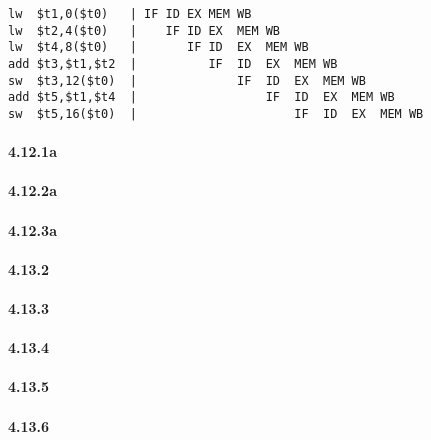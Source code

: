 \documentclass{article}
\begin{document}
\begin{enumerate}
  \begin{verbatim}
lw  $t1,0($t0)   | IF ID EX MEM WB
lw  $t2,4($t0)   |    IF ID EX  MEM WB
lw  $t4,8($t0)   |       IF ID  EX  MEM WB
add $t3,$t1,$t2  |          IF  ID  EX  MEM WB
sw  $t3,12($t0)  |              IF  ID  EX  MEM WB
add $t5,$t1,$t4  |                  IF  ID  EX  MEM WB
sw  $t5,16($t0)  |                      IF  ID  EX  MEM WB
  \end{verbatim}

\end{enumerate}

\clearpage

\paragraph{4.12.1a}

\paragraph{4.12.2a}

\paragraph{4.12.3a}

\paragraph{4.13.2}

\paragraph{4.13.3}

\paragraph{4.13.4}

\paragraph{4.13.5}

\paragraph{4.13.6}
\end{document}
